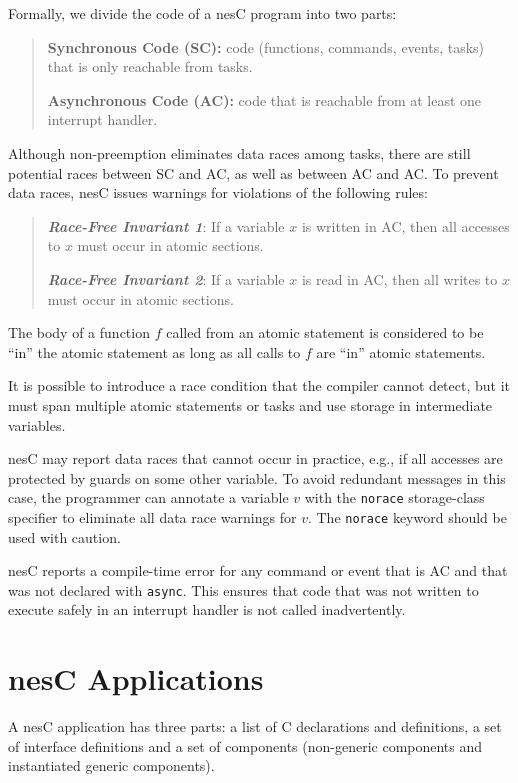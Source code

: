 \documentclass[11pt,letterpaper]{article}
\newcommand{\kw}[1]{{\tt #1}}
\newcommand{\nesc}{nesC\xspace}
\begin{document}
Formally, we divide the code of a \nesc program into two parts:
\begin{quote}
\textbf{Synchronous Code (SC):} code (functions, commands, events, tasks)
that is only reachable from tasks.

\textbf{Asynchronous Code (AC):} code that is reachable from at 
least one interrupt handler.
\end{quote}

Although non-preemption eliminates data races among tasks, there are still
potential races between SC and AC, as well as between AC and AC. To
prevent data races, \nesc issues warnings for violations of the following
rules:
\begin{quote}
{\sl {\bf Race-Free Invariant 1}}: If a variable $x$ is written in AC, then 
all accesses to $x$ must occur in atomic sections.

{\sl {\bf Race-Free Invariant 2}}: If a variable $x$ is read in AC, then 
all writes to $x$ must occur in atomic sections.
\end{quote}
The body of a function $f$ called from an atomic statement is considered to
be ``in'' the atomic statement as long as all calls to $f$ are ``in''
atomic statements.

It is possible to introduce a race condition that the compiler cannot
detect, but it must span multiple atomic statements or tasks and use storage
in intermediate variables.

\nesc may report data races that cannot occur in practice, e.g., if all
accesses are protected by guards on some other variable. To avoid redundant
messages in this case, the programmer can annotate a variable $v$ with the
\kw{norace} storage-class specifier to eliminate all data race warnings for
$v$. The \kw{norace} keyword should be used with caution.

\nesc reports a compile-time error for any command or event that is AC and
that was not declared with \kw{async}. This ensures that code that was not
written to execute safely in an interrupt handler is not called
inadvertently.

\section{\nesc Applications}
\label{sec:app}

A \nesc application has three parts: a list of C declarations and
definitions, a set of interface definitions and a set of components
(non-generic components and instantiated generic components).
\end{document}

